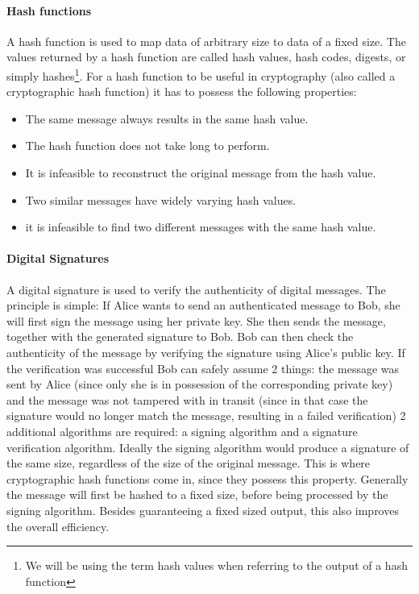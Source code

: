 \documentclass[11pt]{article}
\begin{document}
\paragraph{Hash functions} A hash function is used to map data of arbitrary size to data of a fixed size. The values returned by a hash function are called hash values, hash codes, digests, or simply hashes\footnote{We will be using the term hash values when referring to the output of a hash function}. For a hash function to be useful in cryptography (also called a cryptographic hash function) it has to possess the following properties\cite{Hashwiki}:

\begin{itemize}
	\item The same message always results in the same hash value.
	\item The hash function does not take long to perform.
	\item It is infeasible to reconstruct the original message from the hash value.
	\item Two similar messages have widely varying hash values.
	\item it is infeasible to find two different messages with the same hash value.
\end{itemize}

\paragraph{Digital Signatures} A digital signature is used to verify the authenticity of digital messages. The principle is simple: If Alice wants to send an authenticated message to Bob, she will first sign the message using her private key. She then sends the message, together with the generated signature to Bob. Bob can then check the authenticity of the message by verifying the signature using Alice's public key. If the verification was successful Bob can safely assume 2 things: the message was sent by Alice (since only she is in possession of the corresponding private key) and the message was not tampered with in transit (since in that case the signature would no longer match the message, resulting in a failed verification) 2 additional algorithms are required: a signing algorithm and a signature verification algorithm. Ideally the signing algorithm would produce a signature of the same size, regardless of the size of the original message. This is where cryptographic hash functions come in, since they possess this property. Generally the message will first be hashed to a fixed size, before being processed by the signing algorithm. Besides guaranteeing a fixed sized output, this also improves the overall efficiency.\cite{DigitalSignaturewiki}
\end{document}
